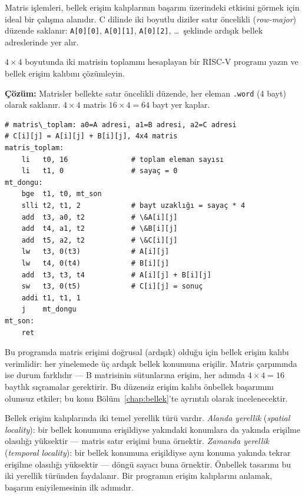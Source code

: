 Matris işlemleri, bellek erişim kalıplarının başarım üzerindeki etkisini görmek için ideal bir çalışma alanıdır. C dilinde iki boyutlu diziler satır öncelikli (\emph{row-major}) düzende saklanır: \texttt{A[0][0]}, \texttt{A[0][1]}, \texttt{A[0][2]}, \ldots\ şeklinde ardışık bellek adreslerinde yer alır.

\begin{ornek}[4.22]
\label{orn:matris-toplam}
$4 \times 4$ boyutunda iki matrisin toplamını hesaplayan bir RISC-V programı yazın ve bellek erişim kalıbını çözümleyin.

\textbf{Çözüm:} Matrisler bellekte satır öncelikli düzende, her eleman \texttt{.word} (4 bayt) olarak saklanır. $4 \times 4$ matris $16 \times 4 = 64$ bayt yer kaplar.

\begin{lstlisting}[style=riscv]
# matris\_toplam: a0=A adresi, a1=B adresi, a2=C adresi
# C[i][j] = A[i][j] + B[i][j], 4x4 matris
matris_toplam:
    li   t0, 16               # toplam eleman sayısı
    li   t1, 0                # sayaç = 0
mt_dongu:
    bge  t1, t0, mt_son
    slli t2, t1, 2            # bayt uzaklığı = sayaç * 4
    add  t3, a0, t2           # \&A[i][j]
    add  t4, a1, t2           # \&B[i][j]
    add  t5, a2, t2           # \&C[i][j]
    lw   t3, 0(t3)            # A[i][j]
    lw   t4, 0(t4)            # B[i][j]
    add  t3, t3, t4           # A[i][j] + B[i][j]
    sw   t3, 0(t5)            # C[i][j] = sonuç
    addi t1, t1, 1
    j    mt_dongu
mt_son:
    ret
\end{lstlisting}

Bu programda matris erişimi doğrusal (ardışık) olduğu için bellek erişim kalıbı verimlidir: her yinelemede üç ardışık bellek konumuna erişilir. Matris çarpımında ise durum farklıdır --- B matrisinin sütunlarına erişim, her adımda $4 \times 4 = 16$ baytlık sıçramalar gerektirir. Bu düzensiz erişim kalıbı önbellek başarımını olumsuz etkiler; bu konu Bölüm~\ref{chap:bellek}'te ayrıntılı olarak incelenecektir.
\end{ornek}

\begin{bilginot}
Bellek erişim kalıplarında iki temel yerellik türü vardır. \emph{Alanda yerellik} (\emph{spatial locality}): bir bellek konumuna erişildiyse yakındaki konumlara da yakında erişilme olasılığı yüksektir --- matris satır erişimi buna örnektir. \emph{Zamanda yerellik} (\emph{temporal locality}): bir bellek konumuna erişildiyse aynı konuma yakında tekrar erişilme olasılığı yüksektir --- döngü sayacı buna örnektir. Önbellek tasarımı bu iki yerellik türünden faydalanır. Bir programın erişim kalıplarını anlamak, başarım eniyilemesinin ilk adımıdır.
\end{bilginot}


